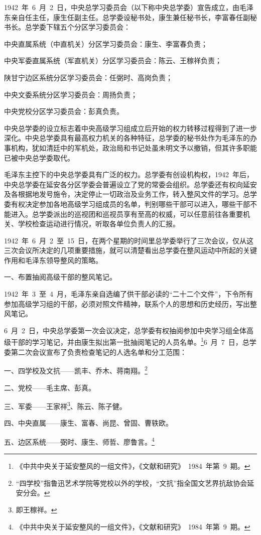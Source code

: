 1942~年~6~月~2~日，中央总学习委员会（以下称中央总学委）宣告成立，由毛泽东亲自任主任，康生任副主任。总学委设秘书处，康生兼任秘书长，李富春任副秘书长。总学委下辖五个分区学习委员会：

中央直属系统（中直机关）分区学习委员会：康生、李富春负责；

中央军委直属系统（军直机关）分区学习委员会：陈云、王稼祥负责；

陕甘宁边区系统分区学习委员会：任弼时、高岗负责；

中央文委系统分区学习委员会：周扬负责；

中央党校分区学习委员会：彭真负责。

中央总学委的设立标志着中央高级学习组成立后开始的权力转移过程得到了进一步深化。中央总学委具有最高权力机关的各种特征，总学委的秘书处作为毛泽东的办事机构，犹如清廷中的军机处，政治局和书记处虽未明文予以撤销，但其许多职能已被中央总学委取代。

毛泽东主控下的中央总学委具有广泛的权力。总学委有创设机构权，1942~年后，中央总学委在延安各分区学委会普遍设立了党的常委会组织。总学委还有权向延安及各根据地发号施令，决定停止一切政治及业务工作，转入整风文件的学习。总学委有权决定参加各地高级学习组成员的名单，判别哪些干部可以进入，哪些干部不能进入。总学委派出的巡视团和巡视员享有至高的权威，可以任意前往各重要机关、学校检查运动进行情况，听取各单位负责人的汇报。

1942~年~6~月~2~至~15~日，在两个星期的时间里总学委举行了三次会议，仅从这三次会议所决定的几项重要措施，就可以清楚看出总学委在整风运动中所起的关键作用和毛泽东领导整风的策略。

一、布置抽阅高级干部的整风笔记。

1942~年~3~至~4~月，毛泽东亲自选编了供干部必读的“二十二个文件”，下令所有参加高级学习组的干部，必须对照文件精神，联系个人的思想和历史经历，写出整风笔记。

6~月~2~日，中央总学委第一次会议决定，总学委有权抽阅参加中央学习组全体高级干部的学习笔记，并由康生拟出第一批抽阅笔记的人员名单。\footnote{《中共中央关于延安整风的一组文件》，《文献和研究》~1984~年第~9~期。}6~月~7~日，总学委第二次会议宣布了负责检查笔记的人选名单和分工范围：

\begin{quoting}
一、四学校及文抗——凯丰、乔木、蒋南翔。\footnote{“四学校”指鲁迅艺术学院等党校以外的学校，“文抗”指全国文艺界抗敌协会延安分会。}

二、党校——毛主席、彭真。

三、军委——王家祥\footnote{即王稼祥。}、陈云、陈子健。

四、中央直属——康生、富春、尚昆、曾固、曹轶欧。

五、边区系统——弼时、康生、师哲、廖鲁言。\footnote{《中共中央关于延安整风的一组文件》，《文献和研究》~1984~年第~9~期。}
\end{quoting}

